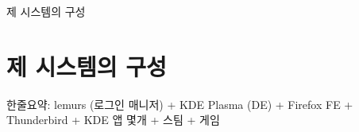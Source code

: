 \documentclass{beamer}
\begin{document}
\begin{frame}{제 시스템의 구성}
    \section{제 시스템의 구성}
    한줄요약: lemurs (로그인 매니저) + KDE Plasma (DE) + Firefox FE + Thunderbird + KDE 앱 몇개 + 스팀 + 게임

\end{frame}
\end{document}
